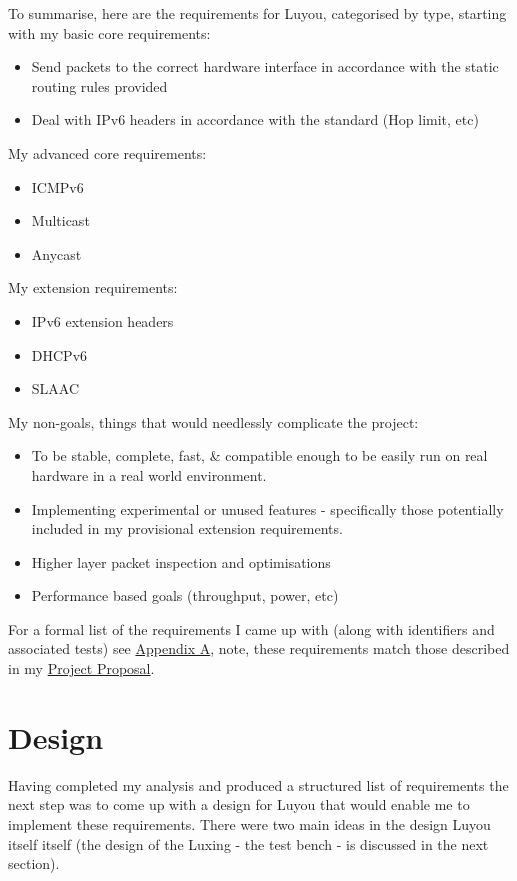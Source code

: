 \documentclass[12pt,a4paper,twoside,openright]{report}
\begin{document}
\bigskip

To summarise, here are the requirements for Luyou, categorised by type, starting with my basic core requirements:
\begin{itemize}
\item Send packets to the correct hardware interface in accordance with the static routing rules provided
\item Deal with IPv6 headers in accordance with the standard (Hop limit, etc)
\end{itemize}
My advanced core requirements:
\begin{itemize}
\item ICMPv6
\item Multicast
\item Anycast
\end{itemize}
My extension requirements:
\begin{itemize}
\item IPv6 extension headers
\item DHCPv6
\item SLAAC
\end{itemize}
My non-goals, things that would needlessly complicate the project:
\begin{itemize}
\item To be stable, complete, fast, \& compatible enough to be easily run on real hardware in a real world environment.
\item Implementing experimental or unused features - specifically those potentially included in my provisional extension requirements.
\item Higher layer packet inspection and optimisations
\item Performance based goals (throughput, power, etc)
\end{itemize}
For a formal list of the requirements I came up with (along with identifiers and associated tests) see \hyperref[appendix::requirements]{Appendix A}, note, these requirements match those described in my  \hyperref[appendix::proposal]{Project Proposal}.

\section{Design}
\label{sec::design}

Having completed my analysis and produced a structured list of requirements the next step was to come up with a design for Luyou that would enable me to implement these requirements.  There were two main ideas in the design Luyou itself itself (the design of the Luxing - the test bench - is discussed in the next section). 
\end{document}

